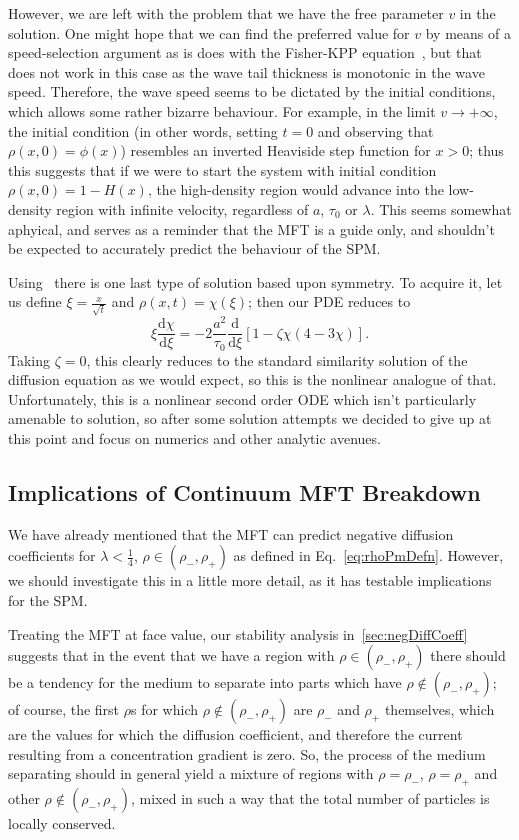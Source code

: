 However, we are left with the problem that we have the free parameter $v$ in the solution. One might hope that we can find the preferred value for $v$ by means of a speed-selection argument as is does with the Fisher-KPP
equation~\cite{sherrat1998}, but that does not work in this case as the wave tail thickness is monotonic in the wave speed. Therefore, the wave speed seems to be dictated by the initial conditions, which allows some rather bizarre
behaviour. For example, in the limit $v \rightarrow +\infty$, the initial condition (in other words, setting $t=0$ and observing that $\rho(x, 0) = \phi(x)$) resembles an inverted Heaviside step function for $x>0$; thus this
suggests that if we were to start the system with initial condition $\rho(x, 0) = 1 - H(x)$, the high-density region would advance into the low-density region with infinite velocity, regardless of $a$, $\tau_0$ or $\lambda$.
This seems somewhat aphyical, and serves as a reminder that the MFT is a guide only, and shouldn't be expected to accurately predict the behaviour of the SPM.

Using~\cite{ivanova2007} there is one last type of solution based upon symmetry. To acquire it, let us define $\xi = \frac{x}{\sqrt{t}}$ and $\rho(x, t) = \chi(\xi)$; then our PDE reduces to
\begin{equation}
 \xi \frac{\mathrm{d}\chi}{\mathrm{d}\xi} = -2\frac{a^2}{\tau_0} \frac{\mathrm{d}}{\mathrm{d}\xi}\left[ 1-\zeta \chi \left(4-3\chi\right) \right].
\end{equation}
Taking $\zeta=0$, this clearly reduces to the standard similarity solution of the diffusion equation as we would expect, so this is the nonlinear analogue of that. Unfortunately, this is a nonlinear second order ODE
which isn't particularly amenable to solution, so after some solution attempts we decided to give up at this point and focus on numerics and other analytic avenues.



\subsection{Implications of Continuum MFT Breakdown}

We have already mentioned that the MFT can predict negative diffusion coefficients for $\lambda<\frac{1}{4}$, $\rho \in (\rho_-, \rho_+)$ as defined in Eq.~\ref{eq:rhoPmDefn}. However, we should investigate this in a little
more detail, as it has testable implications for the SPM.

Treating the MFT at face value, our stability analysis in~\ref{sec:negDiffCoeff} suggests that in the event that we have a region with $\rho \in (\rho_-, \rho_+)$ there should be a tendency for the medium to separate into parts which
have $\rho \not\in (\rho_-, \rho_+)$; of course, the first $\rho$s for which $\rho \not\in (\rho_-, \rho_+)$ are $\rho_-$ and $\rho_+$ themselves, which are the values for which the diffusion coefficient, and therefore the current
resulting from a concentration gradient is zero. So, the process of the medium separating should in general yield a mixture of regions with $\rho = \rho_-$, $\rho = \rho_+$ and other $\rho \not\in (\rho_-, \rho_+)$, mixed in
such a way that the total number of particles is locally conserved.

